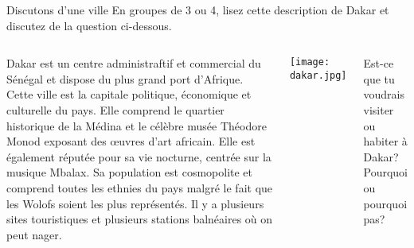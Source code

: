 \begin{frame}{Discutons d'une ville}
  En groupes de 3 ou 4, lisez cette description de Dakar et discutez de la question ci-dessous.
  \vspace{0.25cm}
  \begin{columns}
    \small
      Dakar est un centre administraftif et commercial du Sénégal et dispose du plus grand port d'Afrique.
      Cette ville est la capitale politique, économique et culturelle du pays.
      Elle comprend le quartier historique de la Médina et le célèbre musée Théodore Monod exposant des œuvres d'art africain.
      Elle est également réputée pour sa vie nocturne, centrée sur la musique Mbalax.
      Sa population est cosmopolite et comprend toutes les ethnies du pays malgré le fait que les Wolofs soient les plus représentés.
      Il y a plusieurs sites touristiques et plusieurs stations balnéaires où on peut nager.
      \begin{center}
        \texttt{[image: dakar.jpg]}
      \end{center}
      Est-ce que tu voudrais visiter ou habiter à Dakar?
      Pourquoi ou pourquoi pas?
  \end{columns}
\end{frame}